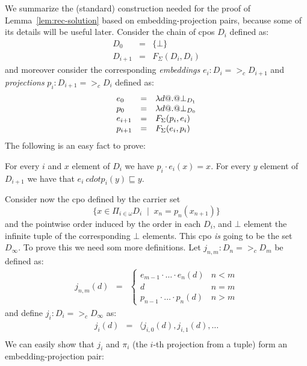 \documentclass[preprint,nocopyrightspace]{sigplanconf}
\begin{document}
We summarize the (standard) construction needed for the proof of Lemma~\ref{lem:rec-solution} based on embedding-projection pairs, 
because some of its details will be useful later. Consider the chain of cpos $D_i$ defined as: 
\[\begin{array}{lcl}
   D_0 & = & \{\bot\} \\ 
   D_{i+1} & = & F_{\Sigma}(D_i,D_i)
\end{array}\]
and moreover consider the corresponding {\em embeddings} $e_i : D_i =>_c D_{i+1}$ and 
{\em projections} $p_i : D_{i+1} =>_c D_i$ defined as:
\[\begin{array}{lcl}
   e_0 & = & \mathsf{\lambda} d @.@ \bot_{D_1} \\
   p_0 & = & \mathsf{\lambda} d @.@ \bot_{D_0} \\
   e_{i+1} & = & F_{\Sigma}(p_i,e_i) \\
   p_{i+1} & = & F_{\Sigma}(e_i,p_i)
\end{array}\]
The following is an easy fact to prove:
\begin{lemma}
For every $i$ and $x$ element of $D_i$ we have $p_i\cdot e_i(x) = x$. For
every $y$ element of $D_{i+1}$ we have that $e_i\ cdot p_i(y) \sqsubseteq y$. 
\end{lemma}
Consider now the cpo defined by the carrier set 
   \[ \{ x \in \Pi_{i \in \omega}D_i \;\mid\; x_n = p_n(x_{n+1}) \} \] 
and the pointwise order induced by the order in each $D_i$, and $\bot$ element the 
infinite tuple of the corresponding $\bot$ elements. This cpo {\em is} going to be the 
set $D_{\infty}$. To prove this we need som more definitions. Let $j_{n,m} : D_n =>_c D_m$ 
be defined as:
\[\begin{array}{lcl}
   j_{n,m}(d) & = & \left\{\begin{array}{ll} 
                             e_{m-1}\cdot\ldots \cdot e_n(d) & n < m \\
                             d                        & n = m \\
                             p_{n-1}\cdot\ldots \cdot p_n(d) & n > m 
                          \end{array}\right.
\end{array}\]
and define $j_i : D_i =>_c D_\infty$ as:
\[\begin{array}{lcl}
   j_i(d) & = & \langle j_{i,0}(d),j_{i,1}(d),\ldots \\
\end{array}\]
We can easily show that $j_i$ and $\pi_i$ (the $i$-th projection from a tuple) form
an embedding-projection pair:
\end{document}
